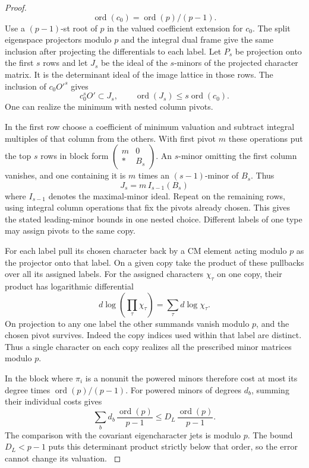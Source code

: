 \begin{proof}
\[
  \operatorname{ord}(c_0)=\operatorname{ord}(p)/(p-1).
\]
Use a \((p-1)\)-st root of \(p\) in the valued coefficient
extension for \(c_0\). The split eigenspace projectors modulo
\(p\) and the integral dual frame give the same inclusion
after projecting the differentials to each label. Let \(P_s\) be projection onto the first \(s\) rows and
let \(J_s\) be the ideal of the \(s\)-minors of the projected
character matrix. It is the determinant ideal of the image
lattice in those rows. The inclusion of \(c_0 O'^s\) gives
\[
                 c_0^s O'\subset J_s,\qquad
                 \operatorname{ord}(J_s)\le s\operatorname{ord}(c_0).
\]
One can realize the minimum with nested column pivots.

In
the first row choose a coefficient of minimum valuation and
subtract integral multiples of that column from the others.
With first pivot \(m\) these operations put the top \(s\) rows
in block form \(\begin{pmatrix}m&0\\ *&B_s\end{pmatrix}\).
An \(s\)-minor omitting the first column vanishes, and one
containing it is \(m\) times an \((s-1)\)-minor of \(B_s\).
Thus
\[
        J_s=m\,I_{s-1}(B_s)
\]
where \(I_{s-1}\) denotes the maximal-minor ideal. Repeat on the
remaining rows, using integral column operations that fix the pivots
already chosen. This
gives the stated leading-minor bounds in one nested choice.
Different labels of one type may assign pivots to the same copy.

For each label pull its chosen character back by a CM element
acting modulo \(p\) as the projector onto that label. On a
given copy take the product of these pullbacks over all its
assigned labels. For the assigned characters \(\chi_\tau\) on one copy, their product has logarithmic differential
\[
  d\log\!\left(\prod_\tau\chi_\tau\right)=\sum_\tau d\log\chi_\tau .
\]
On projection to any one label the other summands vanish
modulo \(p\), and the chosen pivot survives. Indeed the copy
indices used within that label are distinct. Thus a single
character on each copy realizes all the prescribed minor
matrices modulo \(p\).

In the block where \(\pi_i\) is a nonunit the powered minors
therefore cost at most its degree times
\(\operatorname{ord}(p)/(p-1)\).
For powered minors of degrees \(d_b\), summing their individual costs gives
\[
  \sum_b d_b\,\frac{\operatorname{ord}(p)}{p-1}\le D_L\,\frac{\operatorname{ord}(p)}{p-1}.
\]
 The comparison with the
covariant eigencharacter jets is modulo \(p\). The bound
\(D_L<p-1\) puts this determinant product strictly below
that order, so the error cannot change its valuation.
\label{cor:slice-finite-depth-5}


\end{proof}

